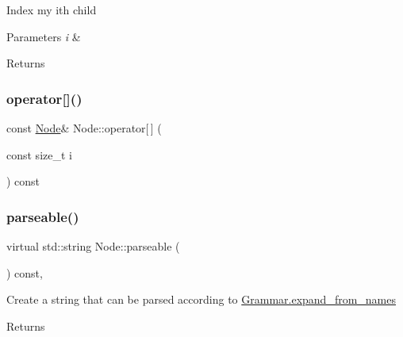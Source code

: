 Index my i\textquotesingle{}th child 
\begin{DoxyParams}{Parameters}
{\em i} & \\
\hline
\end{DoxyParams}
\begin{DoxyReturn}{Returns}

\end{DoxyReturn}
\mbox{\label{class_node_a8bdfdaa5eb291ae5fb417f45fb8a3633}} 
\subsubsection{\texorpdfstring{operator[]()}{operator[]()}\hspace{0.1cm}{\footnotesize\ttfamily [2/2]}}
{\footnotesize\ttfamily const \hyperlink{class_node}{Node}\& Node\+::operator\mbox{[}$\,$\mbox{]} (\begin{DoxyParamCaption}\item[{const size\+\_\+t}]{i }\end{DoxyParamCaption}) const\hspace{0.3cm}{\ttfamily [inline]}}

\mbox{\label{class_node_a70e879ceb71f47787137572d9bee8efa}} 
\subsubsection{\texorpdfstring{parseable()}{parseable()}}
{\footnotesize\ttfamily virtual std\+::string Node\+::parseable (\begin{DoxyParamCaption}{ }\end{DoxyParamCaption}) const\hspace{0.3cm}{\ttfamily [inline]}, {\ttfamily [virtual]}}

Create a string that can be parsed according to \hyperlink{class_grammar_aef582b15696b97c3376cba935a76acef}{Grammar.\+expand\+\_\+from\+\_\+names} \begin{DoxyReturn}{Returns}

\end{DoxyReturn}
\mbox{\label{class_node_a377548bcf1be99ac5181f9434c33c81e}} 

